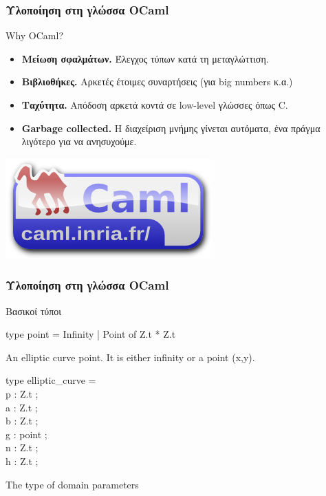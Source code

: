 \documentclass{beamer}
\begin{document}
%
\begin{frame}
\frametitle{Υλοποίηση στη γλώσσα OCaml}
\begin{block}
{Why OCaml?}
\begin{itemize}
\item \textbf{Μείωση σφαλμάτων.} Έλεγχος τύπων κατά τη μεταγλώττιση.
\item \textbf{Βιβλιοθήκες.} Αρκετές έτοιμες συναρτήσεις (για big numbers κ.α.)
\item \textbf{Ταχύτητα.} Απόδοση αρκετά κοντά σε low-level γλώσσες όπως C.
\item \textbf{Garbage collected.} Η διαχείριση μνήμης γίνεται αυτόματα, ένα πράγμα λιγότερο για να ανησυχούμε.
\end{itemize}
\end{block}
\begin{flushright}
\includegraphics[scale=0.7]{ocaml_logo.png}
\end{flushright}
\end{frame}

%
\begin{frame}
\frametitle{Υλοποίηση στη γλώσσα OCaml}
\begin{block}
{Βασικοί τύποι}
\label{type:Ecc.Ecc.point}\begin{ocamldoccode}
type point =
   Infinity
  | Point of Z.t * Z.t
\end{ocamldoccode}
\begin{ocamldocdescription}
An elliptic curve point. It is either infinity or a point (x,y).
\end{ocamldocdescription}


\label{type:Ecc.Ecc.elliptic-underscorecurve}\begin{ocamldoccode}
type elliptic\_curve = {}\\
  p : Z.t ;\\
  a : Z.t ;\\
  b : Z.t ;\\
  g : point ;\\
  n : Z.t ;\\
  h : Z.t ;\\
{}
\end{ocamldoccode}
\begin{ocamldocdescription}
The type of domain parameters
\end{ocamldocdescription}
\end{block}
\end{frame}
\end{document}
